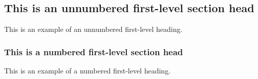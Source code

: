 \subsection{\label{ssec:xxx}This is an unnumbered first-level section head}
This is an example of an unnumbered first-level heading.


\subsubsection{This is a numbered first-level section head}  %
This is an example of a numbered first-level heading.


\endinput  %

